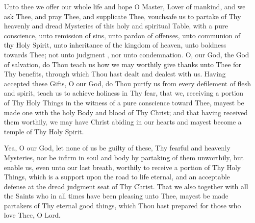 \begin{semisecret}
    \begin{secretprayerbasil}
        Unto thee we offer our whole life and hope O Master, Lover of mankind, and we ask Thee, and pray Thee, and supplicate Thee, vouchsafe us to partake of Thy heavenly and dread Mysteries of this holy and spiritual Table, with a pure conscience, unto remission of sins, unto pardon of offenses, unto communion of thy Holy Spirit, unto inheritance of the kingdom of heaven, unto boldness towards Thee; not unto judgment , nor unto condemnation. 
        \switchcolumn
        O, our God, the God of salvation, do Thou teach us how we may worthily give thanks unto Thee for Thy benefits, through which Thou hast dealt and dealest with us. Having accepted these Gifts, O our God, do Thou purify us from every defilement of flesh and spirit, teach us to achieve holiness in Thy fear, that we, receiving a portion of Thy Holy Things in the witness of a pure conscience toward Thee, mayest be made one with the holy Body and blood of Thy Christ; and that having received them worthily, we may have Christ abiding in our hearts and mayest become a temple of Thy Holy Spirit.
        
        Yea, O our God, let none of us be guilty of these, Thy fearful and heavenly Mysteries, nor be infirm in soul and body by partaking of them unworthily, but enable us, even unto our last breath, worthily to receive a portion of Thy Holy Things, which is a support upon the road to life eternal, and an acceptable defense at the dread judgment seat of Thy Christ. That we also together with all the Saints who in all times have been pleasing unto Thee, mayest be made partakers of Thy eternal good things, which Thou hast prepared for those who love Thee, O Lord. 
    \end{secretprayerbasil}
\end{semisecret}
